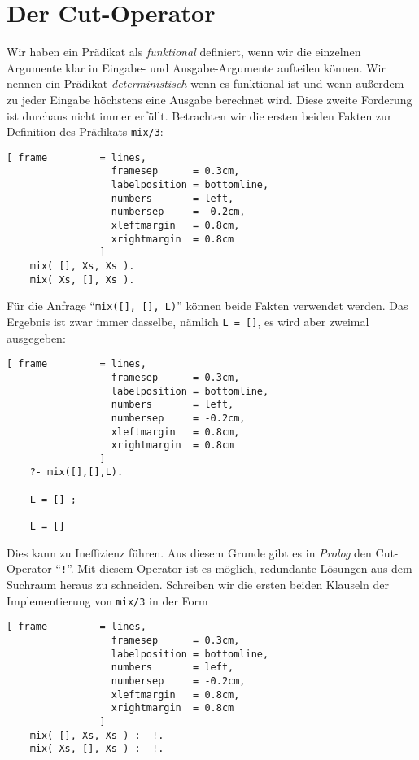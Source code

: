 \section{Der Cut-Operator}
Wir haben ein Pr\"{a}dikat als \emph{funktional} definiert,
wenn wir die einzelnen Argumente klar in Eingabe- und Ausgabe-Argumente
aufteilen k\"{o}nnen.  Wir nennen ein Pr\"{a}dikat \emph{deterministisch} wenn es funktional ist
und wenn außerdem zu jeder Eingabe h\"{o}chstens eine Ausgabe berechnet
wird.  Diese zweite Forderung ist durchaus nicht immer erf\"{u}llt.  Betrachten wir die ersten
beiden Fakten zur Definition des Pr\"{a}dikats \texttt{mix/3}:
\begin{Verbatim}[ frame         = lines, 
                  framesep      = 0.3cm, 
                  labelposition = bottomline,
                  numbers       = left,
                  numbersep     = -0.2cm,
                  xleftmargin   = 0.8cm,
                  xrightmargin  = 0.8cm
                ]
    mix( [], Xs, Xs ).    
    mix( Xs, [], Xs ).
\end{Verbatim}
F\"{u}r die Anfrage ``\texttt{mix([], [], L)}'' k\"{o}nnen beide Fakten verwendet werden.
Das Ergebnis ist zwar immer dasselbe, n\"{a}mlich \texttt{L = []}, es wird aber zweimal ausgegeben:
\begin{Verbatim}[ frame         = lines, 
                  framesep      = 0.3cm, 
                  labelposition = bottomline,
                  numbers       = left,
                  numbersep     = -0.2cm,
                  xleftmargin   = 0.8cm,
                  xrightmargin  = 0.8cm
                ]
    ?- mix([],[],L).
    
    L = [] ;
    
    L = [] 
\end{Verbatim}
Dies kann zu Ineffizienz f\"{u}hren.  Aus diesem Grunde gibt es in \textsl{Prolog} den
Cut-Operator ``\texttt{!}''.  Mit diesem Operator ist es m\"{o}glich, redundante L\"{o}sungen aus
dem Suchraum heraus zu schneiden.  Schreiben wir die ersten beiden Klauseln der
Implementierung von \texttt{mix/3} in der Form 
\begin{Verbatim}[ frame         = lines, 
                  framesep      = 0.3cm, 
                  labelposition = bottomline,
                  numbers       = left,
                  numbersep     = -0.2cm,
                  xleftmargin   = 0.8cm,
                  xrightmargin  = 0.8cm
                ]
    mix( [], Xs, Xs ) :- !.
    mix( Xs, [], Xs ) :- !.
\end{Verbatim}
